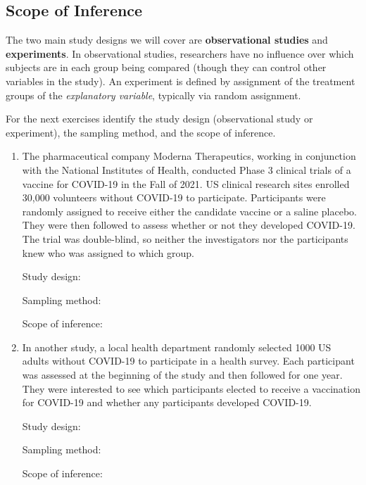 \documentclass[
]{report}
\begin{document}
\subsection{Scope of Inference}\label{scope-of-inference-1}

The two main study designs we will cover are \textbf{observational studies} and \textbf{experiments}. In observational studies, researchers have no influence over which subjects are in each group being compared (though they can control other variables in the study). An experiment is defined by assignment of the treatment groups of the \emph{explanatory variable}, typically via random assignment.

For the next exercises identify the study design (observational study or experiment), the sampling method, and the scope of inference.

\begin{enumerate}
\def\labelenumi{\arabic{enumi}.}
\setcounter{enumi}{14}
\item
  The pharmaceutical company Moderna Therapeutics, working in conjunction with the National Institutes of Health, conducted Phase 3 clinical trials of a vaccine for COVID-19 in the Fall of 2021. US clinical research sites enrolled 30,000 volunteers without COVID-19 to participate. Participants were randomly assigned to receive either the candidate vaccine or a saline placebo. They were then followed to assess whether or not they developed COVID-19. The trial was double-blind, so neither the investigators nor the participants knew who was assigned to which group.
  \vspace{0.1in}

  Study design:
  \vspace{0.3in}

  Sampling method:
  \vspace{0.3in}

  Scope of inference:
  \newpage
\item
  In another study, a local health department randomly selected 1000 US adults without COVID-19 to participate in a health survey. Each participant was assessed at the beginning of the study and then followed for one year. They were interested to see which participants elected to receive a vaccination for COVID-19 and whether any participants developed COVID-19.
  \vspace{0.1in}

  Study design:
  \vspace{0.3in}

  Sampling method:
  \vspace{0.3in}

  Scope of inference:
  \vspace{0.3in}
\end{enumerate}
\end{document}
